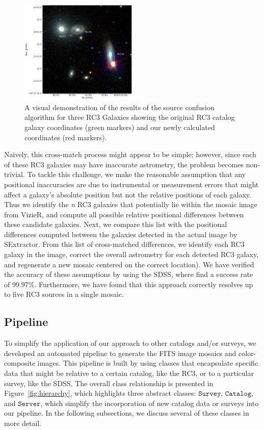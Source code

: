 \documentclass[authoryear, 12pt, 5p, times]{elsarticle}
\begin{document}
\begin{figure}[h]
\includegraphics[width=0.5\textwidth]{figures/navigator}
\caption{A visual demonstration of the results of the source confusion algorithm for three RC3 Galaxies showing the original RC3 catalog galaxy coordinates (green markers) and our newly calculated coordinates (red markers).}
\label{fig:positional_update_plot}
\end{figure}

Naively, this cross-match process might appear to be simple; however, since each of these RC3 galaxies may have inaccurate astrometry, the problem becomes non-trivial. To tackle this challenge, we make the reasonable assumption that any positional inaccuracies are due to instrumental or measurement errors that might affect a galaxy's absolute position but not the relative positions of each galaxy. Thus we identify the \textit{n} RC3 galaxies that potentially lie within the mosaic image from VizieR, and compute all possible relative positional differences between these candidate galaxies. Next, we compare this list with the positional differences computed between the galaxies detected in the actual image by SExtractor. From this list of cross-matched differences, we identify each RC3 galaxy in the image, correct the overall astrometry for each detected RC3 galaxy, and regenerate a new mosaic centered on the correct location). We have verified the accuracy of these assumptions by using the SDSS, where find a success rate of 99.97\%. Furthermore, we have found that this approach correctly resolves up to five RC3 sources in a single mosaic.
	
\subsection{Pipeline}

To simplify the application of our approach to other catalogs and/or surveys, we developed an automated pipeline to generate the FITS image mosaics and color-composite images. This pipeline is built by using classes that encapsulate specific data that might be relative to a certain catalog, like the RC3, or to a particular survey, like the SDSS. The overall class relationship is presented in Figure~\ref{fig:hierarchy}, which highlights three abstract classes: $\texttt{Survey}$, $\texttt{Catalog}$, and $\texttt{Server}$, which simplify the incorporation of new catalog data or surveys into our pipeline. In the following subsections, we discuss several of these classes in more detail.
\end{document}
